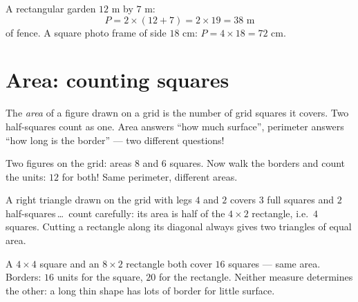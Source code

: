 \begin{example}\label{ex:g4:measure:perimeter}
A rectangular garden $12$ m by $7$ m:
\[
P = 2 \times (12 + 7) = 2 \times 19 = 38 \text{ m}
\]
of fence. A square photo frame of side $18$ cm:
$P = 4 \times 18 = 72$ cm.
\end{example}

\section{Area: counting squares}

\begin{definition}\label{def:g4:measure:area}
The \emph{area} of a figure drawn on a grid is the number
of grid squares it covers. Two half-squares count as one. Area
answers ``how much surface'', perimeter answers ``how long is the
border'' --- two different questions!
\end{definition}

\begin{omfigure}

{\small Two figures on the grid: areas $8$ and $6$ squares. Now walk
the borders and count the units: $12$ for both! Same perimeter,
different areas.}
\end{omfigure}

\begin{example}\label{ex:g4:measure:half}
A right triangle drawn on the grid with legs $4$ and $2$ covers $3$
full squares and $2$ half-squares\,\dots\ count carefully: its area
is half of the $4 \times 2$ rectangle, i.e.\ $4$ squares. Cutting a
rectangle along its diagonal always gives two triangles of equal
area.
\end{example}

\begin{example}\label{ex:g4:measure:samearea}
A $4 \times 4$ square and an $8 \times 2$ rectangle both cover $16$
squares --- same area. Borders: $16$ units for the square, $20$ for
the rectangle. Neither measure determines the other: a long thin
shape has lots of border for little surface.
\end{example}

